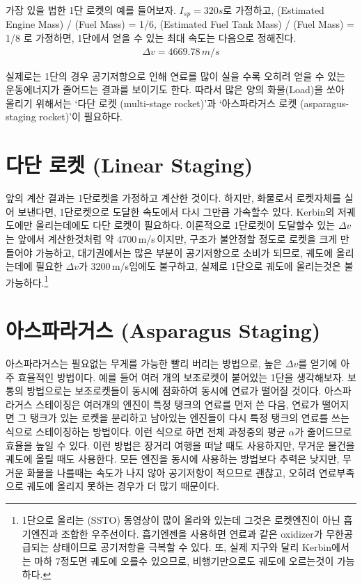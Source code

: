\documentclass[9pt,twoside,openany]{amsbook}
\begin{document}
가장 있을 법한 1단 로켓의 예를 들어보자. $I_{sp} =320 s$로 가정하고, (Estimated Engine Mass) / (Fuel Mass) = 1/6,
(Estimated Fuel Tank Mass) / (Fuel Mass) = 1/8 로 가정하면,
1단에서 얻을 수 있는 최대 속도는 다음으로 정해진다.
\begin{align}
\Delta v = 4669.78\,m/s
\end{align}

실제로는 1단의 경우 공기저항으로 인해 연료를 많이 실을 수록 오히려 얻을 수 있는 운동에너지가 줄어드는 결과를 보이기도 한다. 따라서 많은 양의 화물(Load)을 쏘아 올리기 위해서는 `다단 로켓 (multi-stage rocket)'과 `아스파라거스 로켓 (asparagus-staging rocket)'이 필요하다.


\section{다단 로켓 (Linear Staging)}
앞의 계산 결과는 1단로켓을 가정하고 계산한 것이다. 하지만, 화물로서 로켓자체를 실어 보낸다면, 1단로켓으로 도달한 속도에서 다시 그만큼 가속할수 있다.
Kerbin의 저궤도에만 올리는데에도 다단 로켓이 필요하다. 이론적으로 1단로켓이 도달할수 있는 $\Delta v$는 앞에서 계산한것처럼 약 4700\,m/s\,이지만, 구조가 불안정할 정도로 로켓을 크게 만들어야 가능하고, 대기권에서는 많은 부분이 공기저항으로 소비가 되므로, 궤도에 올리는데에 필요한 $\Delta v$가 3200\,m/s임에도 불구하고, 실제로 1단으로 궤도에 올리는것은 불가능하다.\footnote{1단으로 올리는 (SSTO) 동영상이 많이 올라와 있는데 그것은 로켓엔진이 아닌 흡기엔진과 조합한 우주선이다. 흡기엔젠을 사용하면 연료과 같은 oxidizer가 무한공급되는 상태이므로 공기저항을 극복할 수 있다. 또, 실제 지구와 달리 Kerbin에서는 마하 7정도면 궤도에 오를수 있으므로, 비행기만으로도 궤도에 오르는것이 가능하다.}


\section{아스파라거스 (Asparagus Staging)}
아스파라거스는 필요없는 무게를 가능한 빨리 버리는 방법으로, 높은 $\Delta v$를 얻기에 아주 효율적인 방법이다.
예를 들어 여러 개의 보조로켓이 붙어있는 1단을 생각해보자.
보통의 방법으로는 보조로켓들이 동시에 점화하여 동시에 연료가 떨어질 것이다.
아스파라거스 스테이징은 여러개의 엔진이 특정 탱크의 연료를 먼저 쓴 다음, 
연료가 떨어지면 그 탱크가 있는 로켓을 분리하고 남아있는 엔진들이 다시 특정 탱크의 연료를 쓰는 식으로 스테이징하는 방법이다.
이런 식으로 하면 전체 과정중의 평균 $\alpha$가 줄어드므로 효율을 높일 수 있다.
이런 방법은 장거리 여행을 떠날 때도 사용하지만,
무거운 물건을 궤도에 올릴 때도 사용한다.
모든 엔진을 동시에 사용하는 방법보다 추력은 낮지만,
무거운 화물을 나를때는 속도가 나지 않아 공기저항이 적으므로 괜찮고,
오히려 연료부족으로 궤도에 올리지 못하는 경우가 더 많기 때문이다.
\end{document}
